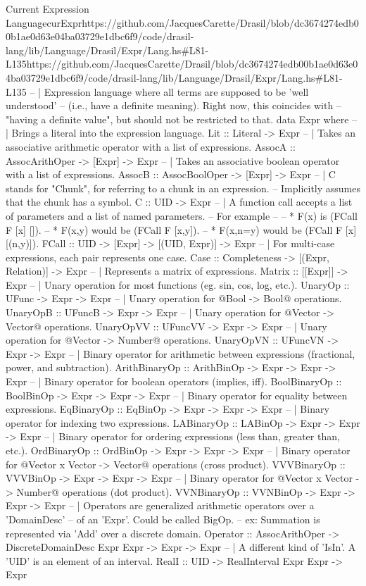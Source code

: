 \begin{haskell}{Current Expression Language}{curExpr}{https://github.com/JacquesCarette/Drasil/blob/dc3674274edb00b1ae0d63e04ba03729e1db\newline{}c6f9/code/drasil-lang/lib/Language/Drasil/Expr/Lang.hs\#L81-L135}{https://github.com/JacquesCarette/Drasil/blob/dc3674274edb00b1ae0d63e04ba03729e1dbc6f9/code/drasil-lang/lib/Language/Drasil/Expr/Lang.hs\#L81-L135}
-- | Expression language where all terms are supposed to be 'well understood'
--   (i.e., have a definite meaning). Right now, this coincides with
--   "having a definite value", but should not be restricted to that.
data Expr where
  -- | Brings a literal into the expression language.
  Lit :: Literal -> Expr
  -- | Takes an associative arithmetic operator with a list of expressions.
  AssocA   :: AssocArithOper -> [Expr] -> Expr
  -- | Takes an associative boolean operator with a list of expressions.
  AssocB   :: AssocBoolOper  -> [Expr] -> Expr
  -- | C stands for "Chunk", for referring to a chunk in an expression.
  --   Implicitly assumes that the chunk has a symbol.
  C        :: UID -> Expr
  -- | A function call accepts a list of parameters and a list of named parameters.
  --   For example
  --
  --   * F(x) is (FCall F [x] []).
  --   * F(x,y) would be (FCall F [x,y]).
  --   * F(x,n=y) would be (FCall F [x] [(n,y)]).
  FCall    :: UID -> [Expr] -> [(UID, Expr)] -> Expr
  -- | For multi-case expressions, each pair represents one case.
  Case     :: Completeness -> [(Expr, Relation)] -> Expr
  -- | Represents a matrix of expressions.
  Matrix   :: [[Expr]] -> Expr
  -- | Unary operation for most functions (eg. sin, cos, log, etc.).
  UnaryOp       :: UFunc -> Expr -> Expr
  -- | Unary operation for @Bool -> Bool@ operations.
  UnaryOpB      :: UFuncB -> Expr -> Expr
  -- | Unary operation for @Vector -> Vector@ operations.
  UnaryOpVV     :: UFuncVV -> Expr -> Expr
  -- | Unary operation for @Vector -> Number@ operations.
  UnaryOpVN     :: UFuncVN -> Expr -> Expr
  -- | Binary operator for arithmetic between expressions (fractional, power, and subtraction).
  ArithBinaryOp :: ArithBinOp -> Expr -> Expr -> Expr
  -- | Binary operator for boolean operators (implies, iff).
  BoolBinaryOp  :: BoolBinOp -> Expr -> Expr -> Expr
  -- | Binary operator for equality between expressions.
  EqBinaryOp    :: EqBinOp -> Expr -> Expr -> Expr
  -- | Binary operator for indexing two expressions.
  LABinaryOp    :: LABinOp -> Expr -> Expr -> Expr
  -- | Binary operator for ordering expressions (less than, greater than, etc.).
  OrdBinaryOp   :: OrdBinOp -> Expr -> Expr -> Expr
  -- | Binary operator for @Vector x Vector -> Vector@ operations (cross product).
  VVVBinaryOp   :: VVVBinOp -> Expr -> Expr -> Expr
  -- | Binary operator for @Vector x Vector -> Number@ operations (dot product).
  VVNBinaryOp   :: VVNBinOp -> Expr -> Expr -> Expr
  -- | Operators are generalized arithmetic operators over a 'DomainDesc'
  --   of an 'Expr'.  Could be called BigOp.
  --   ex: Summation is represented via 'Add' over a discrete domain.
  Operator :: AssocArithOper -> DiscreteDomainDesc Expr Expr -> Expr -> Expr
  -- | A different kind of 'IsIn'. A 'UID' is an element of an interval.
  RealI    :: UID -> RealInterval Expr Expr -> Expr
\end{haskell}
